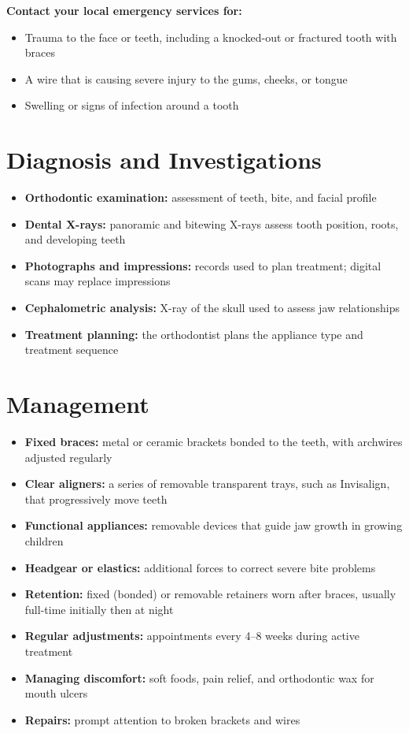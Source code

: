 \textbf{Contact your local emergency services for:}
\begin{itemize}
    \item Trauma to the face or teeth, including a knocked-out or fractured tooth with braces
    \item A wire that is causing severe injury to the gums, cheeks, or tongue
    \item Swelling or signs of infection around a tooth
\end{itemize}

\section*{Diagnosis and Investigations}
\begin{itemize}
    \item \textbf{Orthodontic examination:} assessment of teeth, bite, and facial profile
    \item \textbf{Dental X-rays:} panoramic and bitewing X-rays assess tooth position, roots, and developing teeth
    \item \textbf{Photographs and impressions:} records used to plan treatment; digital scans may replace impressions
    \item \textbf{Cephalometric analysis:} X-ray of the skull used to assess jaw relationships
    \item \textbf{Treatment planning:} the orthodontist plans the appliance type and treatment sequence
\end{itemize}

\section*{Management}
\begin{itemize}
    \item \textbf{Fixed braces:} metal or ceramic brackets bonded to the teeth, with archwires adjusted regularly
    \item \textbf{Clear aligners:} a series of removable transparent trays, such as Invisalign, that progressively move teeth
    \item \textbf{Functional appliances:} removable devices that guide jaw growth in growing children
    \item \textbf{Headgear or elastics:} additional forces to correct severe bite problems
    \item \textbf{Retention:} fixed (bonded) or removable retainers worn after braces, usually full-time initially then at night
    \item \textbf{Regular adjustments:} appointments every 4--8 weeks during active treatment
    \item \textbf{Managing discomfort:} soft foods, pain relief, and orthodontic wax for mouth ulcers
    \item \textbf{Repairs:} prompt attention to broken brackets and wires
\end{itemize}

